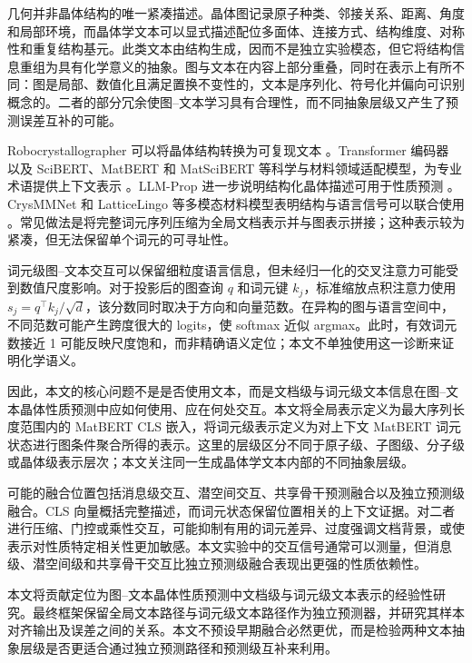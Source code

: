 \documentclass[a4paper,fleqn]{cas-sc}
\begin{document}
几何并非晶体结构的唯一紧凑描述。晶体图记录原子种类、邻接关系、距离、角度和局部环境，而晶体学文本可以显式描述配位多面体、连接方式、结构维度、对称性和重复结构基元。此类文本由结构生成，因而不是独立实验模态，但它将结构信息重组为具有化学意义的抽象。图与文本在内容上部分重叠，同时在表示上有所不同：图是局部、数值化且满足置换不变性的，文本是序列化、符号化并偏向可识别概念的。二者的部分冗余使图--文本学习具有合理性，而不同抽象层级又产生了预测误差互补的可能。

Robocrystallographer 可以将晶体结构转换为可复现文本 \citep{ganose2019robocrystallographer}。Transformer 编码器 \citep{vaswani2017attention,devlin2019bert} 以及 SciBERT、MatBERT 和 MatSciBERT 等科学与材料领域适配模型，为专业术语提供上下文表示 \citep{beltagy2019scibert,walker2021matbert,gupta2022matscibert}。LLM-Prop 进一步说明结构化晶体描述可用于性质预测 \citep{rubungo2025llmprop}。CrysMMNet 和 LatticeLingo 等多模态材料模型表明结构与语言信号可以联合使用 \citep{das2023crysmmnet,munjal2024latticelingo}。常见做法是将完整词元序列压缩为全局文档表示并与图表示拼接；这种表示较为紧凑，但无法保留单个词元的可寻址性。

词元级图--文本交互可以保留细粒度语言信息，但未经归一化的交叉注意力可能受到数值尺度影响。对于投影后的图查询 $q$ 和词元键 $k_j$，标准缩放点积注意力使用 $s_j=q^\top k_j/\sqrt d$，该分数同时取决于方向和向量范数。在异构的图与语言空间中，不同范数可能产生跨度很大的 logits，使 softmax 近似 argmax。此时，有效词元数接近 1 可能反映尺度饱和，而非精确语义定位；本文不单独使用这一诊断来证明化学语义。

因此，本文的核心问题不是是否使用文本，而是文档级与词元级文本信息在图--文本晶体性质预测中应如何使用、应在何处交互。本文将全局表示定义为最大序列长度范围内的 MatBERT CLS 嵌入，将词元级表示定义为对上下文 MatBERT 词元状态进行图条件聚合所得的表示。这里的层级区分不同于原子级、子图级、分子级或晶体级表示层次；本文关注同一生成晶体学文本内部的不同抽象层级。

可能的融合位置包括消息级交互、潜空间交互、共享骨干预测融合以及独立预测级融合。CLS 向量概括完整描述，而词元状态保留位置相关的上下文证据。对二者进行压缩、门控或乘性交互，可能抑制有用的词元差异、过度强调文档背景，或使表示对性质特定相关性更加敏感。本文实验中的交互信号通常可以测量，但消息级、潜空间级和共享骨干交互比独立预测级融合表现出更强的性质依赖性。

本文将贡献定位为图--文本晶体性质预测中文档级与词元级文本表示的经验性研究。最终框架保留全局文本路径与词元级文本路径作为独立预测器，并研究其样本对齐输出及误差之间的关系。本文不预设早期融合必然更优，而是检验两种文本抽象层级是否更适合通过独立预测路径和预测级互补来利用。
\end{document}
